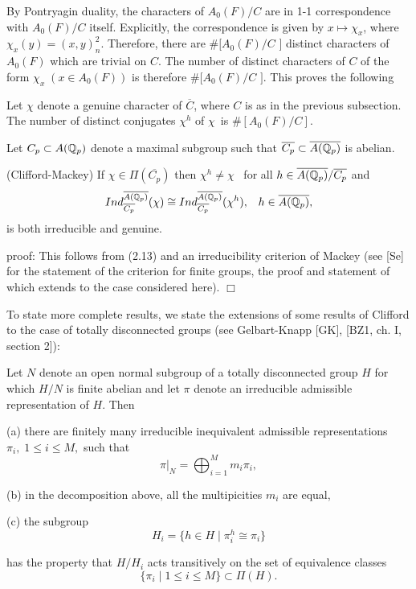 By Pontryagin duality, the characters of $A_0(F)/C$ are in 1-1
correspondence with $A_0(F)/C$ itself. Explicitly, the correspondence is
given by $x\longmapsto \chi _x$, where $\chi _x(y)=(x,y)_n^2$. Therefore,
there are $\#[A_0(F)/C$ $]$ distinct characters of $A_0(F)$ which are
trivial on $C$. The number of distinct characters of $C$ of the form $\chi
_x\;(x\in A_0(F))$ is therefore $\#[A_0(F)/C$ $]$. This proves the following

\begin{lemma}
Let $\chi $ denote a genuine character of $\overline{C}$, where $C$ is as in
the previous subsection. The number of distinct conjugates $\chi ^h$ of $%
\chi $\ is $\#[A_0(F)/C]$.
\end{lemma}

Let $C_p\subset A({\Bbb Q}_p)$ denote a maximal subgroup such that $%
\overline{C_p}\subset \overline{A({\Bbb Q}_p)}$ is abelian.

\begin{lemma}
(Clifford-Mackey) If $\chi \in \Pi (\overline{C_p})$ then $\chi ^h\neq \chi $%
\ for all $h\in \overline{A({\Bbb Q}_p)}/\overline{C_p}$ and 
\[
Ind_{\overline{C_p}}^{\overline{A({\Bbb Q}_p)}}(\chi )\cong Ind_{\overline{%
C_p}}^{\overline{A({\Bbb Q}_p)}}(\chi ^h),\;\;\;h\in \overline{A({\Bbb Q}_p)}%
,
\]
is both irreducible and genuine.
\end{lemma}

{\sf proof:} This follows from (2.13) and an irreducibility criterion of
Mackey (see [Se] for the statement of the criterion for finite groups, the
proof and statement of which extends to the case considered here). $\Box $

To state more complete results, we state the extensions of some results of
Clifford to the case of totally disconnected groups (see Gelbart-Knapp [GK],
[BZ1, ch. I, section 2]):

\begin{lemma}
Let $N$ denote an open normal subgroup of a totally disconnected group $H$
for which $H/N$ is finite abelian and let $\pi $ denote an irreducible
admissible representation of $H$. Then

(a) there are finitely many irreducible inequivalent admissible
representations $\pi _i,\;1\leq i\leq M,$ such that 
\[
\pi |_N=\bigoplus_{i=1}^Mm_i\pi _i,
\]

(b) in the decomposition above, all the multipicities $m_i$ are equal,

(c) the subgroup 
\[
H_i=\{h\in H\;|\;\pi _i^h\cong \pi _i\}
\]

has the property that $H/H_i$ acts transitively on the set of equivalence
classes 
\[
\{\pi _i\;|\;1\leq i\leq M\}\subset \Pi (H).
\]
\end{lemma}


